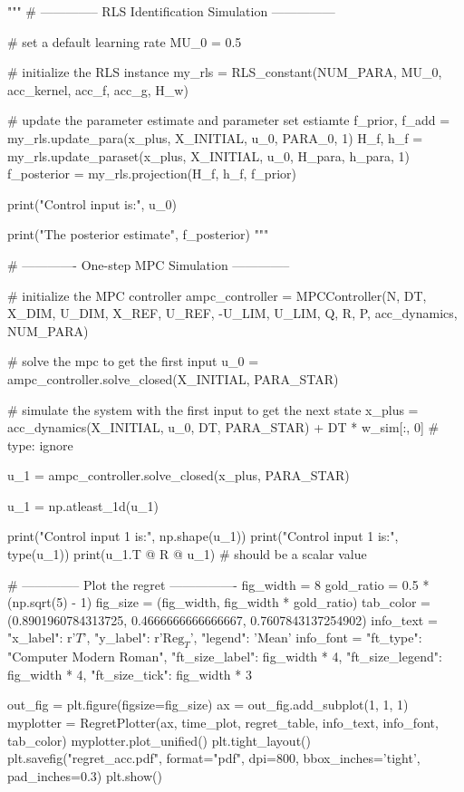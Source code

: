 """
# -------------- RLS Identification Simulation ---------------

# set a default learning rate
MU_0 = 0.5

# initialize the RLS instance
my_rls = RLS_constant(NUM_PARA, MU_0, acc_kernel, acc_f, acc_g, H_w)

# update the parameter estimate and parameter set estiamte
f_prior, f_add = my_rls.update_para(x_plus, X_INITIAL, u_0, PARA_0, 1)
H_f, h_f = my_rls.update_paraset(x_plus, X_INITIAL, u_0, H_para, h_para, 1)
f_posterior = my_rls.projection(H_f, h_f, f_prior)

print("Control input is:", u_0)

print("The posterior estimate", f_posterior)
"""


# ------------- One-step MPC Simulation --------------

# initialize the MPC controller
ampc_controller = MPCController(N, DT,
                                X_DIM, U_DIM,
                                X_REF, U_REF,
                                -U_LIM, U_LIM,
                                Q, R, P,
                                acc_dynamics, NUM_PARA)

# solve the mpc to get the first input
u_0 = ampc_controller.solve_closed(X_INITIAL, PARA_STAR)

# simulate the system with the first input to get the next state
x_plus = acc_dynamics(X_INITIAL, u_0, DT, PARA_STAR) + DT * w_sim[:, 0] # type: ignore

u_1 = ampc_controller.solve_closed(x_plus, PARA_STAR)

u_1 = np.atleast_1d(u_1)

print("Control input 1 is:", np.shape(u_1))
print("Control input 1 is:", type(u_1))
print(u_1.T @ R @ u_1)  # should be a scalar value

    
# -------------- Plot the regret ----------------
fig_width = 8
gold_ratio = 0.5 * (np.sqrt(5) - 1)
fig_size = (fig_width, fig_width * gold_ratio)
tab_color = (0.8901960784313725, 0.4666666666666667, 0.7607843137254902)
info_text = {"x_label": r'$T$',
             "y_label": r'$\mathrm{Reg}_T$',
             "legend": 'Mean'}
info_font = {"ft_type": "Computer Modern Roman",
             "ft_size_label": fig_width * 4, "ft_size_legend": fig_width * 4, "ft_size_tick": fig_width * 3}


out_fig = plt.figure(figsize=fig_size)
ax = out_fig.add_subplot(1, 1, 1)
myplotter = RegretPlotter(ax, time_plot, regret_table, 
                          info_text, info_font, tab_color)
myplotter.plot_unified()
plt.tight_layout()
plt.savefig("regret_acc.pdf", format="pdf",
            dpi=800, bbox_inches='tight', pad_inches=0.3)
plt.show()